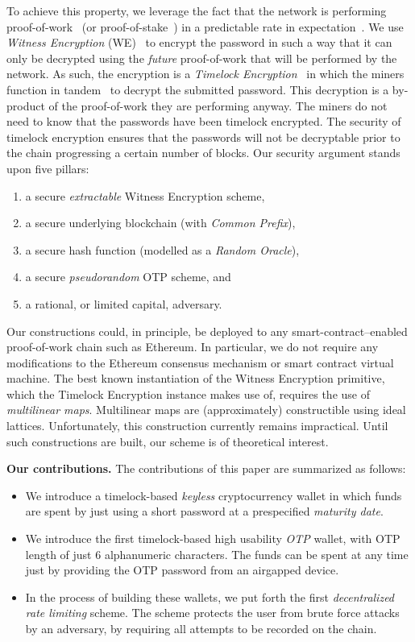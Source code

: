To achieve this property, we leverage the fact that the network is performing
proof-of-work~\cite{pow} (or proof-of-stake~\cite{ouroboros}) in a predictable rate in expectation~\cite{bitcoin-sok}. We use \emph{Witness Encryption}
(WE)~\cite{STOC:GGSW13} to encrypt
the password in such a way that it can only be decrypted using the \emph{future}
proof-of-work that will be performed by the network. As such, the encryption
is a \emph{Timelock Encryption}~\cite{timelock} in which the miners function in tandem~\cite{timelock-bitcoin} to
decrypt the submitted password. This decryption is a by-product of
the proof-of-work they are performing anyway. The miners do not need to know that the
passwords have been timelock encrypted. The security of timelock encryption
ensures that the passwords will not be decryptable prior to the chain progressing
a certain number of blocks. Our security argument stands upon five pillars:

\begin{enumerate}
      \item a secure \emph{extractable} Witness Encryption scheme,
      \item a secure underlying blockchain (with \emph{Common Prefix}),
      \item a secure hash function (modelled as a \emph{Random Oracle}),
      \item a secure \emph{pseudorandom} OTP scheme, and
      \item a rational, or limited capital, adversary.
\end{enumerate}

Our constructions could, in principle, be deployed to any smart-contract--enabled
proof-of-work chain such as Ethereum. In particular, we do not require any modifications
to the Ethereum consensus mechanism or smart contract virtual machine. The
best known instantiation of the Witness Encryption primitive, which the Timelock Encryption
instance makes use of, requires the use of \emph{multilinear maps}.
Multilinear maps are (approximately) constructible using ideal lattices.
Unfortunately, this construction currently remains impractical.
Until such constructions are built, our scheme is of theoretical interest.

\noindent
\textbf{Our contributions.}
The contributions of this paper are summarized as follows:

\begin{itemize}
  \item We introduce a timelock-based \emph{keyless} cryptocurrency wallet in which funds are spent by
        just using a short password at a prespecified \emph{maturity date}.
  \item We introduce the first timelock-based high usability \emph{OTP} wallet, with OTP length of
        just 6 alphanumeric characters. The funds can be spent at any time just by
        providing the OTP password from an airgapped device.
  \item In the process of building these wallets, we put forth the first
        \emph{decentralized rate limiting} scheme. The scheme protects the user
        from brute force attacks by an adversary, by requiring all attempts to
        be recorded on the chain.
\end{itemize}

